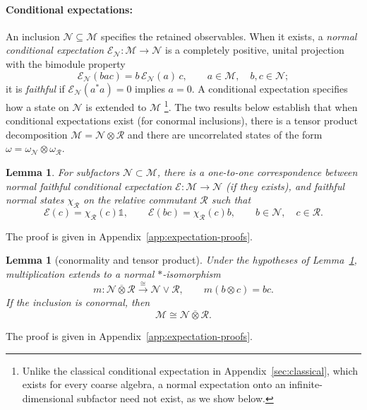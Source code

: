 \documentclass[a4paper,11pt]{article}
\newtheorem{lemma}[theorem]{Lemma}
\theoremstyle{definition}
\let\mathbbm\mathds
\newcommand{\mR}{\mathcal{R}}
\newcommand{\mN}{\mathcal{N}}
\newcommand{\mM}{\mathcal{M}}
\newcommand{\mE}{\mathcal{E}}
\begin{document}
\paragraph{Conditional expectations:} An inclusion $\mN\subseteq\mM$ specifies the retained observables.
When it exists, a \emph{normal conditional expectation}
$\mE_{\mN}:\mM\to\mN$ is a completely positive, unital projection
with the bimodule property
\begin{equation}
 \mE_{\mN}(bac)=b\,\mE_{\mN}(a)\,c,
 \qquad a\in\mM,\quad b,c\in\mN;
 \label{eq:CE-bimodular}
\end{equation}
it is \emph{faithful} if $\mE_{\mN}(a^*a)=0$ implies $a=0$. A conditional expectation specifies how a state on $\mN$ is extended to $\mM$ \footnote{Unlike the classical conditional expectation in Appendix~\ref{sec:classical}, which exists for every coarse algebra,
a normal expectation onto an infinite-dimensional subfactor need not exist, as we show below.}. The two results below establish that when conditional expectations exist (for conormal inclusions), there is a tensor product decomposition $\mM=\mN\otimes \mR$ and there are uncorrelated states of the form $\omega=\omega_\mN\otimes\omega_\mR$.

\begin{lemma}\label{lem:expectation-slice}
For subfactors $\mN\subset \mM$, there is a one-to-one correspondence between normal faithful conditional expectation $\mE:\mM\to\mN$ (if they exists), and faithful normal states $\chi_{\mR}$ on
the relative commutant $\mR$ such that
\begin{equation}
 \mE(c)=\chi_{\mR}(c)\mathbbm 1,
 \qquad \mE(b c)=\chi_{\mR}(c)b,
 \qquad b\in\mN,\quad c\in\mR.
\end{equation}
\end{lemma}
The proof is given in Appendix~\ref{app:expectation-proofs}.

\begin{lemma}[conormality and tensor product]\label{prop:conormal-factorization}
Under the hypotheses of Lemma~\ref{lem:expectation-slice}, multiplication
extends to a normal $*$-isomorphism
\begin{equation}
 m:\mN\overline\otimes\mR
 \overset{\cong}{\longrightarrow}\mN\vee\mR,
 \qquad m(b\otimes c)=b c.
\end{equation}
If the inclusion is conormal, then
\begin{equation}\label{eq:conormal-factorization}
\mM\cong
 \mN\overline\otimes\mR .
\end{equation}
\end{lemma}
The proof is given in Appendix~\ref{app:expectation-proofs}.
\end{document}
